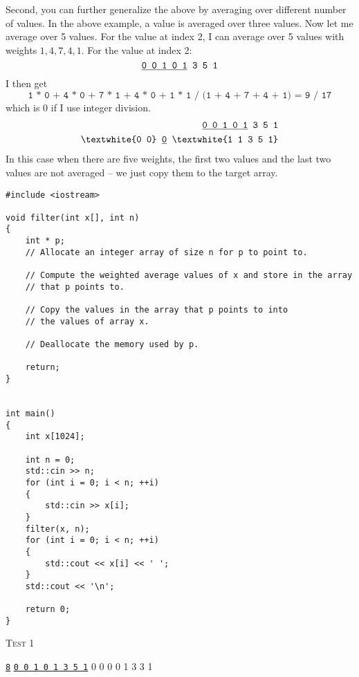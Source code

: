 Second, you can further generalize the above by averaging over different number
of values.
In the above example, a value is averaged over three values.
Now let me average over 5 values.
For the value at index 2, I can average over 5 values with weights
$1,4,7,4,1$.
For the value at index 2:
\[
\texttt{\underline{0 0 1 0 1} 3 5 1}
\]
I then get
\[
\texttt{1 * 0 + 4 * 0 + 7 * 1 + 4 * 0 + 1 * 1 / (1 + 4 + 7 + 4 + 1)
= 9 / 17}
\]
which is 0 if I use integer division.
\begin{align*}
\texttt{\underline{0 0 1 0 1} 3 5 1} & \\
\texttt{\textwhite{0 0} \underline{0} \textwhite{1 1 3 5 1}} &
\end{align*}
In this case when there are five weights, the first two values
and the last two values are not averaged -- we just copy them to the
target array.

\begin{Verbatim}[commandchars=\~\!\@,frame=single]
#include <iostream>

void filter(int x[], int n)
{
    int * p;
    // Allocate an integer array of size n for p to point to.

    // Compute the weighted average values of x and store in the array
    // that p points to.

    // Copy the values in the array that p points to into
    // the values of array x.

    // Deallocate the memory used by p.
    
    return; 
}


int main()
{
    int x[1024];
    
    int n = 0;
    std::cin >> n;
    for (int i = 0; i < n; ++i)
    {
        std::cin >> x[i];
    }
    filter(x, n);
    for (int i = 0; i < n; ++i)
    {
        std::cout << x[i] << ' ';
    }
    std::cout << '\n';
    
    return 0;
}
\end{Verbatim}



\textsc{Test 1}
\begin{console}[commandchars=\\\{\}]
\underline{\texttt{8}}
\underline{\texttt{0 0 1 0 1 3 5 1}}
0 0 0 0 1 3 3 1 \\
\end{console}
